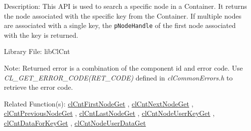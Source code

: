 \begin{Desc}
\item[Description:]This API is used to search a specific node in a Container. It returns the node associated with the specific key from the 
Container. If multiple nodes are associated with a single key, the {\tt{pNodeHandle}} of the first node associated with the key is returned.\end{Desc}
\begin{Desc}
\item[Library File:]lib\-Cl\-Cnt\end{Desc}
\begin{Desc}
\item[Note:]Returned error is a combination of the component id and error code. Use \textit{CL\_\-GET\_\-ERROR\_\-CODE(RET\_\-CODE)} defined in \textit{clCommonErrors.h} to retrieve the error code.\end{Desc}
\begin{Desc}
\item[Related Function(s):]\hyperlink{pagecnt110}{cl\-Cnt\-First\-Node\-Get} , \hyperlink{pagecnt112}{cl\-Cnt\-Next\-Node\-Get} , 
\hyperlink{pagecnt113}{cl\-Cnt\-Previous\-Node\-Get} , \hyperlink{pagecnt111}{cl\-Cnt\-Last\-Node\-Get} , 
\hyperlink{pagecnt115}{cl\-Cnt\-Node\-User\-Key\-Get} , \hyperlink{pagecnt116}{cl\-Cnt\-Data\-For\-Key\-Get} ,
\hyperlink{pagecnt117}{cl\-Cnt\-Node\-User\-Data\-Get} \end{Desc}


\newpage
